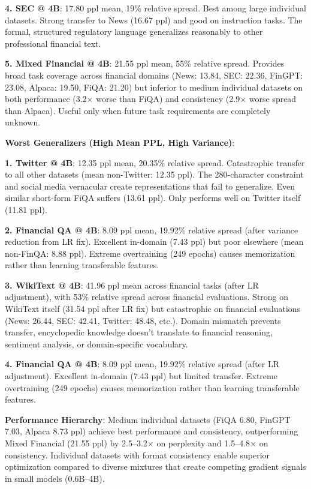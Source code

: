 \textbf{4. SEC @ 4B}: 17.80 ppl mean, 19\% relative spread. Best among large individual datasets. Strong transfer to News (16.67 ppl) and good on instruction tasks. The formal, structured regulatory language generalizes reasonably to other professional financial text.

\textbf{5. Mixed Financial @ 4B}: 21.55 ppl mean, 55\% relative spread. Provides broad task coverage across financial domains (News: 13.84, SEC: 22.36, FinGPT: 23.08, Alpaca: 19.50, FiQA: 21.20) but inferior to medium individual datasets on both performance (3.2$\times$ worse than FiQA) and consistency (2.9$\times$ worse spread than Alpaca). Useful only when future task requirements are completely unknown.

\textbf{Worst Generalizers (High Mean PPL, High Variance)}:

\textbf{1. Twitter @ 4B}: 12.35 ppl mean, 20.35\% relative spread. Catastrophic transfer to all other datasets (mean non-Twitter: 12.35 ppl). The 280-character constraint and social media vernacular create representations that fail to generalize. Even similar short-form FiQA suffers (13.61 ppl). Only performs well on Twitter itself (11.81 ppl).

\textbf{2. Financial QA @ 4B}: 8.09 ppl mean, 19.92\% relative spread (after variance reduction from LR fix). Excellent in-domain (7.43 ppl) but poor elsewhere (mean non-FinQA: 8.88 ppl). Extreme overtraining (249 epochs) causes memorization rather than learning transferable features.

\textbf{3. WikiText @ 4B}: 41.96 ppl mean across financial tasks (after LR adjustment), with \~53\% relative spread across financial evaluations. Strong on WikiText itself (31.54 ppl after LR fix) but catastrophic on financial evaluations (News: 26.44, SEC: 42.41, Twitter: 48.48, etc.). Domain mismatch prevents transfer, encyclopedic knowledge doesn't translate to financial reasoning, sentiment analysis, or domain-specific vocabulary.

\textbf{4. Financial QA @ 4B}: 8.09 ppl mean, 19.92\% relative spread (after LR adjustment). Excellent in-domain (7.43 ppl) but limited transfer. Extreme overtraining (249 epochs) causes memorization rather than learning transferable features.

\textbf{Performance Hierarchy}: Medium individual datasets (FiQA 6.80, FinGPT 7.03, Alpaca 8.73 ppl) achieve best performance and consistency, outperforming Mixed Financial (21.55 ppl) by 2.5–3.2$\times$ on perplexity and 1.5–4.8$\times$ on consistency. Individual datasets with format consistency enable superior optimization compared to diverse mixtures that create competing gradient signals in small models (0.6B–4B).

